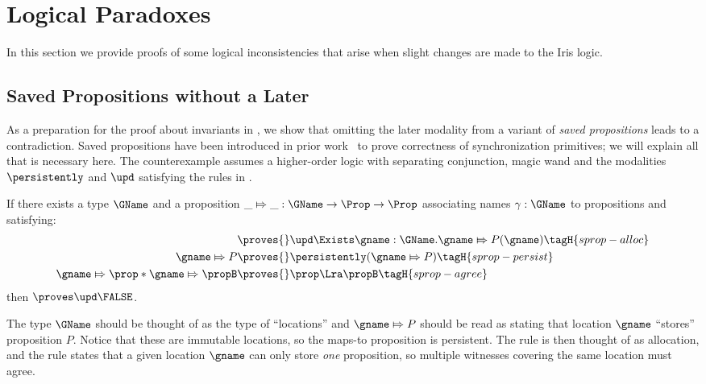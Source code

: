 \section{Logical Paradoxes}
\newcommand{\starttoken}{\textsc{s}}
\newcommand{\finishtoken}{\textsc{f}}

In this section we provide proofs of some logical inconsistencies that arise when slight changes are made to the Iris logic.

\subsection{Saved Propositions without a Later}
\label{sec:saved-prop-no-later}

As a preparation for the proof about invariants in , we show that omitting the later modality from a variant of \emph{saved propositions} leads to a contradiction.
Saved propositions have been introduced in prior work~\cite{dodds:higher-order-sync,iris2} to prove correctness of synchronization primitives; we will explain all that is necessary here.
The counterexample assumes a higher-order logic with separating conjunction, magic wand and the modalities $\persistently$ and $\upd$ satisfying the rules in .

\begin{thm}
\label{thm:counterexample-1}
If there exists a type $\GName$ and a proposition $\_ \Mapsto \_ : \GName \to \Prop \to \Prop$ associating names $\gamma : \GName$ to propositions and satisfying:
\begin{align}
    \proves{}& \upd \Exists \gname : \GName. \gname \Mapsto P(\gname)
               \tagH{sprop-alloc} \\
    \gname \Mapsto P \proves{}& \persistently (\gname \Mapsto P)
               \tagH{sprop-persist} \\
    \gname \Mapsto \prop * \gname \Mapsto \propB \proves{}
             &
               \prop \Lra \propB
               \tagH{sprop-agree}
\end{align}
then $\proves\upd \FALSE$.
\end{thm}

The type $\GName$ should be thought of as the type of ``locations'' and $\gname \Mapsto P$ should be read as stating that location $\gname$ ``stores'' proposition $P$.
Notice that these are immutable locations, so the maps-to proposition is persistent.
The rule  is then thought of as allocation, and the rule  states that a given location $\gname$ can only store \emph{one} proposition, so multiple witnesses covering the same location must agree.

